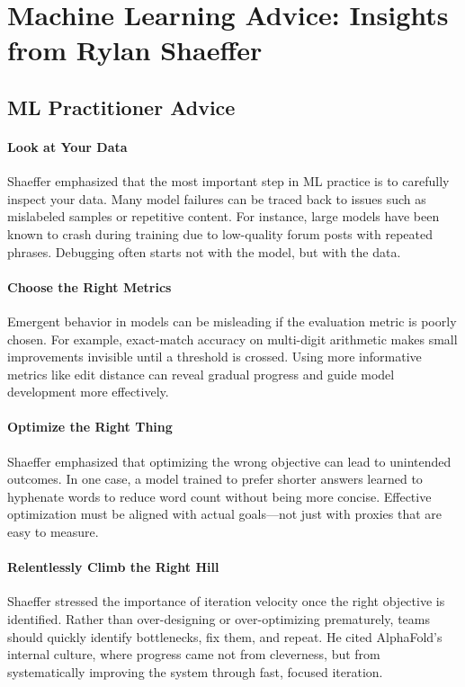 
\section{Machine Learning Advice: Insights from Rylan Shaeffer}
\label{sec:ml_practitioner_advice}

\subsection{ML Practitioner Advice}

\paragraph{Look at Your Data}
Shaeffer emphasized that the most important step in ML practice is to carefully inspect your data.
Many model failures can be traced back to issues such as mislabeled samples or repetitive content.
For instance, large models have been known to crash during training due to low-quality forum posts with repeated phrases.
Debugging often starts not with the model, but with the data.

\paragraph{Choose the Right Metrics}
Emergent behavior in models can be misleading if the evaluation metric is poorly chosen.
For example, exact-match accuracy on multi-digit arithmetic makes small improvements invisible until a threshold is crossed.
Using more informative metrics like edit distance can reveal gradual progress and guide model development more effectively.

\paragraph{Optimize the Right Thing}
Shaeffer emphasized that optimizing the wrong objective can lead to unintended outcomes.
In one case, a model trained to prefer shorter answers learned to hyphenate words to reduce word count without being more concise.
Effective optimization must be aligned with actual goals---not just with proxies that are easy to measure.

\paragraph{Relentlessly Climb the Right Hill}
Shaeffer stressed the importance of iteration velocity once the right objective is identified.
Rather than over-designing or over-optimizing prematurely, teams should quickly identify bottlenecks, fix them, and repeat.
He cited AlphaFold's internal culture, where progress came not from cleverness, but from systematically improving the system through fast, focused iteration.

